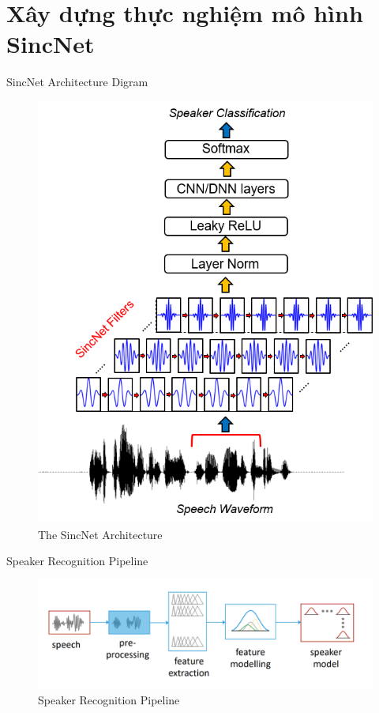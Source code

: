 \documentclass[notheorems, aspectratio=54]{beamer}
\begin{document}
\section{Xây dựng thực nghiệm mô hình \textbf{SincNet}}
\begin{frame}{SincNet Architecture Digram}
	\begin{figure}[H]
		\includegraphics[width=0.4\linewidth]{images/SincNet.png}
		\caption{The SincNet Architecture}
		\label{fig:writing-thesis}
	\end{figure}
\end{frame}
\begin{frame}{Speaker Recognition Pipeline}
	\begin{figure}[H]
		\includegraphics[width=0.95\linewidth]{images/speaker_recognition_pipeline.png}
		\caption{Speaker Recognition Pipeline}
		\label{fig:writing-thesis}
	\end{figure}
\end{frame}
\end{document}
